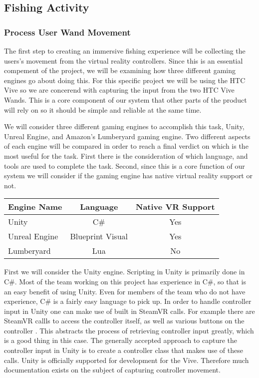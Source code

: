 \documentclass[10pt,journal,compsoc,onecolumn, draftclsnofoot]{IEEEtran}
\begin{document}
\subsection{Fishing Activity}
\subsubsection{Process User Wand Movement}
The first step to creating an immersive fishing experience will be collecting the users's movement from the virtual reality controllers.
Since this is an essential compement of the project, we will be examining how three different gaming engines go about doing this.
For this specific project we will be using the HTC Vive so we are concerend with capturing the input from the two HTC Vive Wands.
This is a core component of our system that other parts of the product will rely on so it should be simple and reliable at the same time.

We will consider three different gaming engines to accomplish this task, Unity, Unreal Engine, and Amazon's Lumberyard gaming engine.
Two different aspects of each engine will be compared in order to reach a final verdict on which is the most useful for the task.
First there is the consideration of which language, and tools are used to complete the task.
Second, since this is a core function of our system we will consider if the gaming engine has native virtual reality support or not.

\vspace{2mm}
\begin{table}[h!]
\centering
  \begin{tabular}{ | l || c | c |  }
  \hline
  Engine Name & Language & Native VR Support\\
  \hline
  Unity  & C\# & Yes\\ \hline
  Unreal Engine & Blueprint Visual & Yes\\ \hline
  Lumberyard & Lua & No\\ \hline
  \hline
  \end{tabular}
\end{table}
\vspace{2mm}

First we will consider the Unity engine. Scripting in Unity is primarily done in C\#.
Most of the team working on this project has experience in C\#, so that is an easy benefit of using Unity.
Even for members of the team who do not have experience, C\# is a fairly easy language to pick up.
In order to handle controller input in Unity one can make use of built in SteamVR calls.
For example there are SteamVR callls to access the controller itself, as well as various buttons on the controller \cite{steamvr_controllers}.
This abstracts the process of retrieving controller input greatly, which is a good thing in this case.
The generally accepted approach to capture the controller input in Unity is to create a controller class that makes use of these calls.
Unity is officially supported for development for the Vive.
Therefore much documentation exists on the subject of capturing controller movement.
\end{document}
